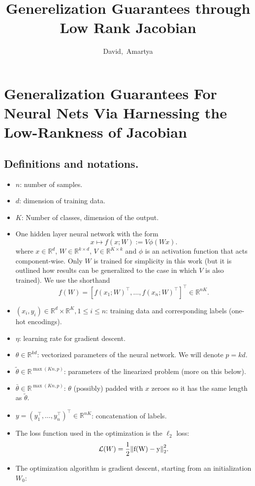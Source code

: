 \documentclass[a4paper]{article}
\title{Generelization Guarantees through Low Rank  Jacobian}
\author{David,~Amartya}
\date{}
\newcommand{\R}{\mathbb{R}}
\begin{document}
\maketitle


\section{Generalization Guarantees For Neural Nets Via Harnessing the Low-Rankness of Jacobian}


\subsection*{Definitions and notations.}
\begin{itemize}
\item $n$: number of samples.
\item $d$: dimension of training data.
\item $K$: Number of classes, dimension of the output.
\item One hidden layer neural network with the form
    \[
    x \mapsto f(x ; W):= V \phi(W x).
    \] 
    where $x\in\R^d$, $W\in \R^{k\times d}$, $V\in \R^{K\times k}$ and $\phi$ is an activation function that acts component-wise. Only $W$ is trained for simplicity in this work (but it is outlined how results can be generalized to the case in which $V$ is also trained). We use the shorthand
    \[
        f(W) = [f(x_1;W)^\top, \dots, f(x_n;W)^\top]^\top \in \R^{nK}.
    \] 
\item $(x_i, y_i) \in \R^d\times\R^K, 1\leq i\leq n$: training data and corresponding labels (one-hot encodings). 
\item $\eta$: learning rate for gradient descent.
\item $\theta \in \R^{kd}$: vectorized parameters of the neural network. We will denote $p=kd$.
\item $\tilde{\theta} \in \R^{\max(Kn,p)}$: parameters of the linearized problem (more on this below).
\item $\bar{\theta} \in \R^{\max(Kn,p)}$: $\theta$ (possibly) padded with $x$ zeroes so it has the same length as $\tilde{\theta}$.
\item $y = (y_1^\top,\dots, y_n^\top)^\top \in \R^{nK}$: concatenation of labels.
\item The loss function used in the optimization is the $\ell_2$ loss:
    \[
        \mathcal{L}(W) = \frac{1}{2} \mathrm{\left\lVert f(W)-y\right\rVert}_2^2.
    \] 
\item The optimization algorithm is gradient descent, starting from an initialization $W_0$:

\end{itemize}
\end{document}
